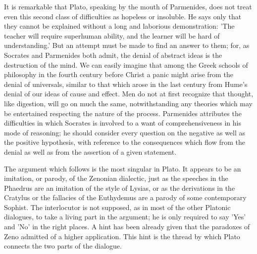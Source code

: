 \documentclass[11pt,letter]{article}
\begin{document}
\par  It is remarkable that Plato, speaking by the mouth of Parmenides, does not treat even this second class of difficulties as hopeless or insoluble. He says only that they cannot be explained without a long and laborious demonstration: 'The teacher will require superhuman ability, and the learner will be hard of understanding.' But an attempt must be made to find an answer to them; for, as Socrates and Parmenides both admit, the denial of abstract ideas is the destruction of the mind. We can easily imagine that among the Greek schools of philosophy in the fourth century before Christ a panic might arise from the denial of universals, similar to that which arose in the last century from Hume's denial of our ideas of cause and effect. Men do not at first recognize that thought, like digestion, will go on much the same, notwithstanding any theories which may be entertained respecting the nature of the process. Parmenides attributes the difficulties in which Socrates is involved to a want of comprehensiveness in his mode of reasoning; he should consider every question on the negative as well as the positive hypothesis, with reference to the consequences which flow from the denial as well as from the assertion of a given statement.

\par  The argument which follows is the most singular in Plato. It appears to be an imitation, or parody, of the Zenonian dialectic, just as the speeches in the Phaedrus are an imitation of the style of Lysias, or as the derivations in the Cratylus or the fallacies of the Euthydemus are a parody of some contemporary Sophist. The interlocutor is not supposed, as in most of the other Platonic dialogues, to take a living part in the argument; he is only required to say 'Yes' and 'No' in the right places. A hint has been already given that the paradoxes of Zeno admitted of a higher application. This hint is the thread by which Plato connects the two parts of the dialogue.
\end{document}
